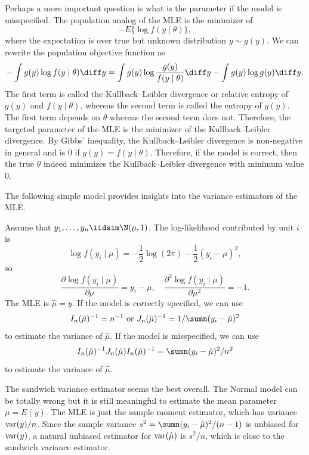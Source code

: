 Perhaps a more important question is what is the parameter if the model is misspecified.  The population analog of the MLE is the minimizer of
$$
- E \{  \log f(y\mid \theta) \} ,
$$
where the expectation is over true but unknown distribution $y \sim g(y)$.  We can rewrite the population objective function as
$$
 -\int g(y) \log f(y\mid \theta)  \diff y
= \int g(y) \log  \frac{ g(y) }{ f(y\mid \theta)  }  \diff y
-\int g(y) \log  g(y)  \diff y .
$$
The first term is called the Kullback--Leibler divergence or relative entropy of $g(y)$ and $f(y\mid \theta)$, whereas the second term is called the entropy of $g(y)$. The first term depends on $\theta$ whereas the second term does not. Therefore, the targeted parameter of the MLE is the minimizer of the Kullback--Leibler divergence. By Gibbs' inequality, the  Kullback--Leibler divergence is non-negative in general and is $0$ if $g(y) = f(y\mid \theta)$. Therefore, if the model is correct, then the true $\theta$ indeed minimizes the Kullback--Leibler divergence with minimum value $0$. 


The following simple model provides insights into the variance estimators of the MLE. 

 

\begin{example}
Assume that $y_1,\ldots, y_n \iidsim  \N(\mu ,1 )$. The log-likelihood contributed by unit $i$ is 
$$
\log f(y_i \mid \mu) = -\frac{1}{2} \log (2\pi) - \frac{1}{2}  (y_i -  \mu)^2,
$$
so
$$
\frac{ \partial \log f(y_i \mid \mu) }{ \partial \mu } =  y_i -  \mu ,\quad
\frac{ \partial^2 \log f(y_i \mid \mu) }{ \partial \mu^2 } =  - 1. 
$$
The MLE is $\hat{\mu} = \bar{y}$. 
If the model is correctly specified, we can use 
$$
I_n(\hat{\mu})^{-1} = n^{-1} \text{ or }
J_n(\hat{\mu})^{-1} = 1 / \sumn  (y_i -  \hat\mu)^2
$$
to estimate the variance of $\hat{\mu}$. If the model is misspecified, we can use
$$
I_n(\hat{\mu})^{-1} J_n(\hat{\mu})I_n(\hat{\mu})^{-1} =  \sumn  (y_i -  \hat\mu)^2/n^2
$$
to estimate the variance of $\hat{\mu}$. 

The sandwich variance estimator seems the best overall. The Normal model can be totally wrong but it is still meaningful to estimate the mean parameter $\mu = E(y)$. The MLE is just the sample moment estimator, which has variance $\textup{var}(y)/n$. Since the sample variance $s^2 = \sumn  (y_i -  \hat\mu)^2/(n-1)$ is unbiased for $\textup{var}(y)$, a natural unbiased estimator for $\textup{var}(\hat{\mu})$ is $s^2/n$, which is close to the sandwich variance estimator. 
\end{example}



